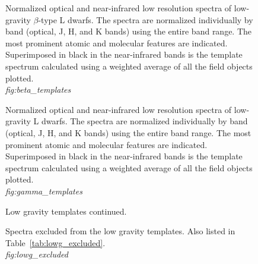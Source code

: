 \documentclass[12pt,preprint]{aastex}
\begin{document}
\begin{figure}
	\caption{Normalized optical and near-infrared low resolution spectra of low-gravity $\beta$-type L
dwarfs. The spectra are normalized individually by band (optical, J, H, and K bands)
using the entire band range. The most prominent atomic and molecular features are indicated. Superimposed in black in the near-infrared
bands is the template spectrum calculated using a weighted average of all the
field objects plotted. \\
\emph{fig:beta_templates}}
	\label{fig:beta_templates}
\end{figure}

\begin{figure}
	\caption{Normalized optical and near-infrared low resolution spectra of low-gravity L
dwarfs. The spectra are normalized individually by band (optical, J, H, and K bands)
using the entire band range. The most prominent atomic and molecular features are indicated. Superimposed in black in the near-infrared
bands is the template spectrum calculated using a weighted average of all the
field objects plotted. \\
\emph{fig:gamma_templates}}
	\label{fig:gamma_templates}
\end{figure}

\begin{figure}
	\caption{Low gravity templates continued.}
\end{figure}


\begin{figure}
	\caption{Spectra excluded from the low gravity templates. Also listed in Table~\ref{tab:lowg_excluded}. \\
	\emph{fig:lowg_excluded}}
	\label{fig:lowg_excluded}
\end{figure}
\begin{figure}
	
\end{figure}
\end{document}

